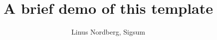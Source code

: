 \documentclass[aspectratio=169]{beamer}
\title{%
	A brief demo of this template
}
\author{%
	Linus Nordberg, Sigsum
}
\begin{document}
	\begin{frame}
		\titlepage
	\end{frame}

	
\end{document}
